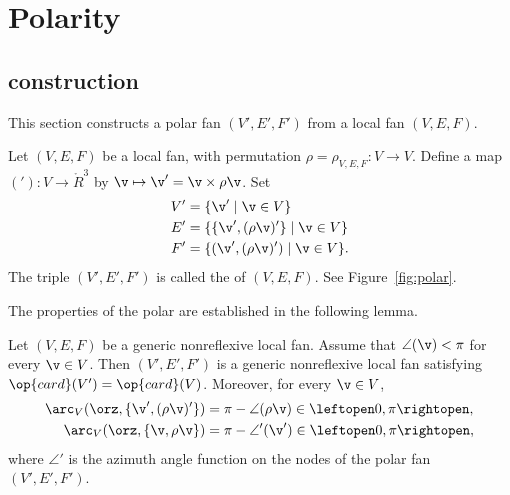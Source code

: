 \section{Polarity}


\subsection{construction}

This section constructs a polar fan $(V',E',F')$ from a local fan $(V,E,F)$.

\begin{definition}[polar]
  Let $(V,E,F)$ be a local fan, with permutation
  $\rho=\rho_{V,E,F}:V\to V$.  Define a map $('): V \to \ring{R}^3$ by
  $\v\mapsto\v' = \v\times\rho\v$.  Set
\begin{align*}
V' & = \{\v' \mid \v\in V\}\\
E' & = \{\{\v',(\rho\v)'\}\mid \v\in V\}\\
F' &=\{ (\v',(\rho\v)') \mid \v\in V\}.
\end{align*}
The triple $(V',E',F')$ is called the  of $(V,E,F)$.
See Figure~\ref{fig:polar}.
\end{definition}
%
%
%
%

\figHEABLRG %

The properties of the polar are established in the
following lemma.

\begin{lemma}\label{lemma:polar-fan}
  Let $(V,E,F)$ be a generic nonreflexive local fan. 
Assume that $\angle(\v)<\pi$ for every $\v\in V$.  Then $(V',E',F')$ is
a generic nonreflexive local fan satisfying $\op{card}(V')=\op{card}(V)$.
Moreover, for every $\v\in V$,
\begin{align*}
\arc_V(\orz,\{\v',(\rho\v)'\}) 
&= \pi - \angle(\rho\v) \in \leftopen 0,\pi\rightopen,\\
\arc_V(\orz,\{\v,\rho\v\}) 
&= \pi - \angle'(\v')\in\leftopen 0,\pi\rightopen,
\end{align*}
where $\angle'$ is the azimuth angle function on the nodes of the
polar fan $(V',E',F')$.
\end{lemma}


